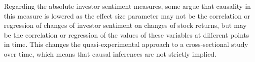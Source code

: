 \par
Regarding the absolute investor sentiment measures, some argue that causality in this measure is lowered as the effect size parameter may not be the correlation or regression of changes of investor sentiment on changes of stock returns, but may be the correlation or regression of the values of these variables at different points in time. This changes the quasi-experimental approach to a cross-sectional study over time, which means that causal inferences are not strictly implied.
